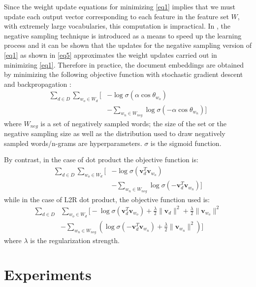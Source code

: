 \documentclass[11pt,a4paper]{article}
\begin{document}
Since the weight update equations for minimizing \eqref{eq1} implies that we must update each output vector corresponding to each feature in the feature set $W$, with extremely large vocabularies, this computation is impractical. In \cite{mikolov2013}, the negative sampling technique is introduced as a means to speed up the learning process and it can be shown that the updates for the negative sampling version of \eqref{eq1} as shown in \eqref{eq5} approximates the weight updates carried out in minimizing \eqref{eq1}. Therefore in practice, the document embeddings are obtained by minimizing the following objective function with stochastic gradient descent and backpropagation \cite{rumelhart1986}: 
\begin{align}
\sum_{d \in D} \sum_{w_o \in W_d} \biggl[ &- \log \sigma \left( \alpha \cos \theta_{w_o} \right) \nonumber \\
&- \sum_{w_n \in W_{neg}} \log \sigma \left( - \alpha \cos \theta_{w_n} \right) \biggr] \label{eq5}
\end{align}
where $W_{neg}$ is a set of negatively sampled words;
the size of the set or the negative sampling size as
well as the distribution used to draw negatively
sampled words/n-grams are hyperparameters. $\sigma$ is
the sigmoid function. 

By contrast, in the case of dot product the objective function is:
\begin{align}
\sum_{d \in D} \sum_{w_o \in W_d} \biggl[ &- \log \sigma \left( \mathbold{v}_d^T \mathbold{v}_{w_o} \right) \nonumber \\
&- \sum_{w_n \in W_{neg}} \log \sigma \left( - \mathbold{v}_d^T \mathbold{v}_{w_n} \right) \biggr] \label{eqdp}
\end{align}
while in the case of L2R dot product, the objective function used is:
\begin{align}
\sum_{d \in D} &\sum_{w_o \in W_d} \biggl[ - \log \sigma \left( \mathbold{v}_d^T \mathbold{v}_{w_o} \right) + \frac{\lambda}{2}\lVert \mathbold{v}_d \rVert^2 + \frac{\lambda}{2}\lVert \mathbold{v}_{w_o} \rVert^2 \nonumber \\
&- \sum_{w_n \in W_{neg}} \left( \log \sigma \left( - \mathbold{v}_d^T \mathbold{v}_{w_n} \right) + \frac{\lambda}{2}\lVert \mathbold{v}_{w_n} \rVert^2 \right) \biggr] \label{eql2r}
\end{align}
where  $\lambda$ is the regularization strength.

\section{Experiments}
\end{document}
